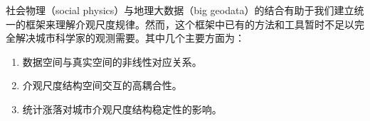 
社会物理（social physics）与地理大数据（big geodata）的结合有助于我们建立统一的框架来理解介观尺度规律。然而，这个框架中已有的方法和工具暂时不足以完全解决城市科学家的观测需要。其中几个主要方面为：\begin{enumerate}
    \item 数据空间与真实空间的非线性对应关系。
    \item 介观尺度结构空间交互的高耦合性。
    \item 统计涨落对城市介观尺度结构稳定性的影响。
\end{enumerate}



